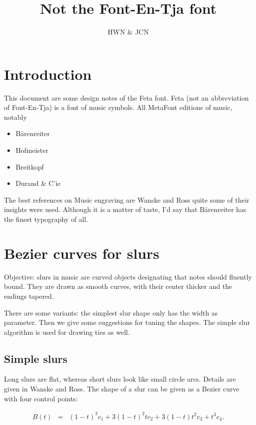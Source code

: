 \documentclass{article}
\title{Not the Font-En-Tja font}
\author{HWN \& JCN}
\begin{document}
\maketitle


\section{Introduction}

This document are some design notes of the Feta font.  Feta (not an
abbreviation of Font-En-Tja) is a font of music symbols.  All MetaFont
editions of music, notably
\begin{itemize}
\item B\"arenreiter
\item Hofmeister
\item Breitkopf
\item Durand \& C'ie
\end{itemize}

The best references on Music engraving are Wanske\cite{wanske} and
Ross\cite{ross} quite some of their insights were used.  Although it
is a matter of taste, I'd say that B\"arenreiter has the finest
typography of all.


\section{Bezier curves for slurs}

Objective:  slurs in music are curved objects designating that notes
should fluently bound.  They are drawn as smooth curves, with their
center thicker and the endings tapered.

There are some variants: the simplest slur shape only has the width as
parameter.  Then we give some suggestions for tuning the shapes.  The
simple slur algorithm is used for drawing ties as well.



\subsection{Simple slurs}

Long slurs are flat, whereas short slurs look like small circle arcs.
Details are given in Wanske\cite{ross} and Ross\cite{wanske}.  The
shape of a slur can be given as a Bezier curve with four control
points:

\begin{eqnarray*}
  B(t) &=& (1-t)^3c_1 +3(1-t)^2tc_2 + 3(1-t)t^2c_3 + t^3c_4.
\end{eqnarray*}
\end{document}
